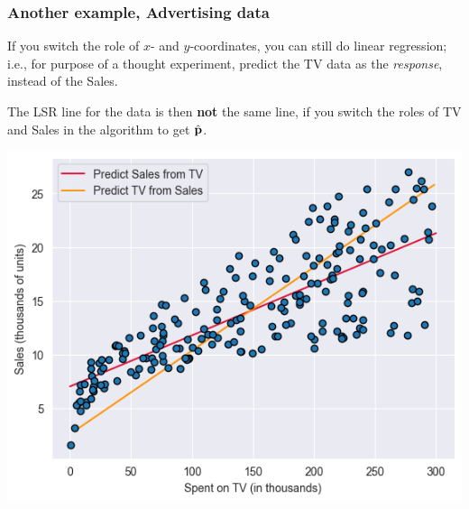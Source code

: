 \documentclass{beamer}
\theoremstyle{example}
\begin{document}
\begin{frame}[fragile]
\frametitle{Another example, Advertising data}
If you switch the role of $x$- and $y$-coordinates, you can still do linear regression; i.e., for purpose of a thought experiment, predict the TV data as the \emph{response}, instead of the Sales.

The LSR line for the data is then \textbf{not} the same line, if you switch the roles of TV and Sales in the algorithm to get $\hat{\bf p}$.

\vspace*{12pt}
\centering
\includegraphics[height=0.4\textheight]{advertising-plot2.png}

\end{frame}
\end{document}
